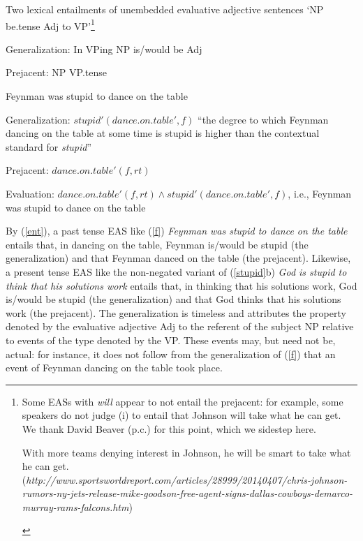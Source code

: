 \documentclass[11pt,fleqn]{article}
\newcommand{\6}{\mbox{$[\hspace*{-.6mm}[$}}
\newcommand{\9}{\mbox{$]\hspace*{-.6mm}]$}}
\begin{document}
\begin{exe}
\ex\label{ent} Two lexical entailments of unembedded evaluative adjective sentences `NP be{\sc .tense} Adj to VP'\footnote{Some EASs with {\em will} appear to not entail the prejacent: for example, some speakers do not judge (i) to entail that Johnson will take what he can get. We thank David Beaver (p.c.) for this point, which we sidestep here.
\begin{exe}
 With more teams denying interest in Johnson, he will be smart
to take what he can get. \\ ({\em http://www.sportsworldreport.com/articles/28999/20140407/chris-johnson-rumors-ny-jets-release-mike-goodson-free-agent-signs-dallas-cowboys-demarco-murray-rams-falcons.htm})
\end{exe}} 

\begin{xlist}

\ex Generalization: In VPing NP is/would be Adj

\ex Prejacent: NP VP{\sc .tense}


Feynman was stupid to dance on the table

Generalization: $stupid'(dance.on.table', f)$ ``the degree to which Feynman dancing on the table at some time is stupid is higher than the contextual standard for {\em stupid}''


Prejacent: $dance.on.table'(f,rt)$

Evaluation: $dance.on.table'(f,rt) \wedge stupid'(dance.on.table', f)$, i.e., Feynman was stupid to dance on the table

\end{xlist}
\end{exe}
By (\ref{ent}), a past tense EAS like (\ref{f}) {\em Feynman was stupid to dance on the table} entails that, in dancing on the table, Feynman is/would be stupid (the generalization) and that Feynman danced on the table (the prejacent). Likewise, a present tense EAS like the non-negated variant of (\ref{stupid}b) {\em God is stupid to think that his solutions work} entails that, in thinking that his solutions work, God is/would be stupid (the generalization) and that God thinks that his solutions work (the prejacent). The generalization is timeless and attributes the property denoted by the evaluative adjective Adj to the referent of the subject NP relative to events of the type denoted by the VP. These events may, but need not be, actual: for instance, it does not follow from the generalization of (\ref{f}) that an event of Feynman dancing on the table took place.
\end{document}
